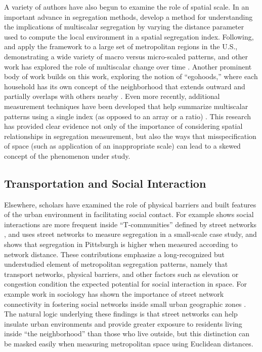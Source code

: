 \documentclass[
  10pt,
]{article}
\begin{document}
A variety of authors have also begun to examine the role of spatial
scale. In an important advance in segregation methods,
\citet{reardon2008GeographicScale} develop a method for understanding
the implications of multiscalar segregation by varying the distance
parameter used to compute the local environment in a spatial segregation
index. Following, \citet{reardon2009RaceSpace} and
\citet{lee2008CensusTract} apply the framework to a large set of
metropolitan regions in the U.S., demonstrating a wide variety of macro
versus micro-scaled patterns, and other work has explored the role of
multiscalar change over time
\citep{bailey2012HowSpatial, fowler2016SegregationMultiscalar}. Another
prominent body of work builds on this work, exploring the notion of
``egohoods,'' where each household has its own concept of the
neighborhood that extends outward and partially overlaps with others
nearby
\citep{hipp2013EgohoodsWaves, petrovic2019FreedomTyranny, petrovic2018MultiscaleMeasures}.
Even more recently, additional measurement techniques have been
developed that help summarize multiscalar patterns using a single index
(as opposed to an array or a ratio)
\citep{bezenac2022MeasuringVisualizing, olteanu2019SegregationMultiscalar, osth2015MeasuringScale, clark2015MultiscalarAnalysis}.
This research has provided clear evidence not only of the importance of
considering spatial relationships in segregation measurement, but also
the ways that misspecification of space (such as application of an
inappropriate scale) can lead to a skewed concept of the phenomenon
under study.

\hypertarget{transportation-and-social-interaction}{%
\subsection{Transportation and Social
Interaction}\label{transportation-and-social-interaction}}

Elsewhere, scholars have examined the role of physical barriers and
built features of the urban environment in facilitating social contact.
For example \citet{grannis2005TCommunitiesPedestrian} shows social
interactions are more frequent inside ``T-communities'' defined by
street networks \citep{grannis2005TCommunitiesPedestrian}, and
\citet{roberto2018SpatialProximity} uses street networks to measure
segregation in a small-scale case study, and shows that segregation in
Pittsburgh is higher when measured according to network distance. These
contributions emphasize a long-recognized but understudied element of
metropolitan segregation patterns, namely that transport networks,
physical barriers, and other factors such as elevation or congestion
condition the expected potential for social interaction in space. For
example work in sociology has shown the importance of street network
connectivity in fostering social networks inside small urban geographic
zones \citep{grannis1998ImportanceTrivial}. The natural logic underlying
these findings is that street networks can help insulate urban
environments and provide greater exposure to residents living inside
``the neighborhood'' than those who live outside, but this distinction
can be masked easily when measuring metropolitan space using Euclidean
distances.
\end{document}
